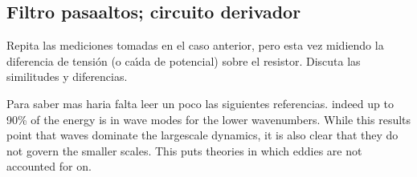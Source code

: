 \documentclass[laboratorio]{guia}
\begin{document}
\subsection{Filtro pasaaltos; circuito derivador}

Repita las mediciones tomadas en el caso anterior, pero esta vez midiendo 
la diferencia de tensi\'on (o ca\'\i da de potencial) sobre el resistor. 
Discuta las similitudes y diferencias. 

\begin{sabermas} Para saber mas haria falta leer un poco las siguientes
    referencias.  indeed up to 90\% of the energy is in wave modes for the
    lower wavenumbers. While this results point that waves dominate the
    largescale dynamics, it is also clear that they do not govern the smaller
    scales.  This puts theories in which eddies are not accounted for on.
\end{sabermas}

%  
\end{document}
